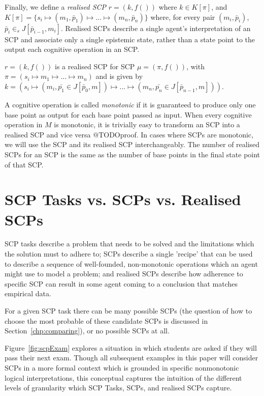 Finally, we define a \textit{realised SCP} $r = (k, f())$ where $k \in K[\pi]$, and $K[\pi]=\{s_i \longmapsto (m_1,\bar{p}_1) \longmapsto ... \longmapsto (m_n,\bar{p}_n)\}$ where, for every pair $(m_i,\bar{p}_i)$, $\bar{p}_i \in_s J[\bar{p}_{i-1},m_i]$. Realised SCPs describe a single agent's interpretation of an SCP and associate only a single epistemic state, rather than a state point to the output each cognitive operation in an SCP. 

$r=(k, f())$ is a realised SCP for SCP $\mu=(\pi,f())$, with $\pi=(s_i\longmapsto m_1 \longmapsto ...\longmapsto m_n)$ and is given by $k=(s_i \longmapsto (m_i, \bar{p_1} \in J[\bar{p}_{0},m]) \longmapsto ... \longmapsto (m_n, \bar{p_n} \in J[\bar{p}_{n-1},m]))$.

A cognitive operation is called \textit{monotonic} if it is guaranteed to produce only one base point as output for each base point passed as input. When every cognitive operation in $M$ is monotonic, it is trivially easy to transform an SCP into a realised SCP and vice versa @TODOproof. In cases where SCPs are monotonic, we will use the SCP and its realised SCP interchangeably. The number of realised SCPs for an SCP is the same as the number of base points in the final state point of that SCP.



\section{SCP Tasks vs. SCPs vs. Realised SCPs}

SCP tasks describe a problem that needs to be solved and the limitations which the solution must to adhere to; SCPs describe a single 'recipe' that can be used to describe a sequence of well-founded, non-monotonic operations which an agent might use to model a problem; and realised SCPs describe how adherence to specific SCP can result in some agent coming to a conclusion that matches empirical data.

For a given SCP task there can be many possible SCPs (the question of how to choose the most probable of these candidate SCPs is discussed in Section~\ref{chp:comparing}), or no possible SCPs at all.

Figure~\ref{fig:scpExam} explores a situation in which students are asked if they will pass their next exam. Though all subsequent examples in this paper will consider SCPs in a more formal context which is grounded in specific nonmonotonic logical interpretations, this conceptual captures the intuition of the different levels of granularity which SCP Tasks, SCPs, and realised SCPs capture. 

